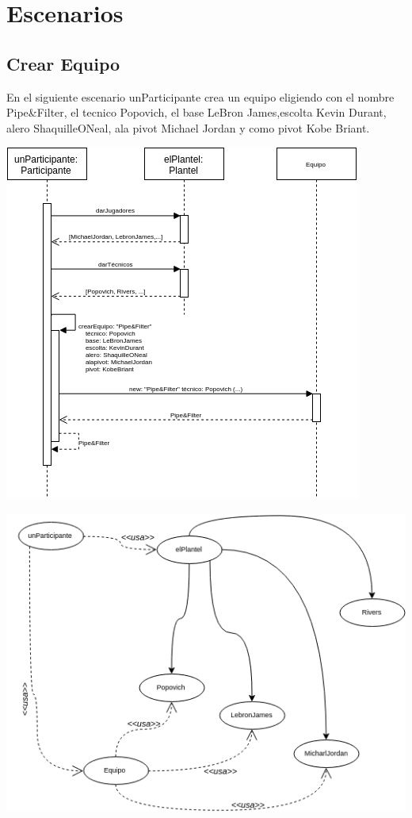 \section{Escenarios}

\subsection{Crear Equipo}

En el siguiente escenario unParticipante crea un equipo eligiendo con el nombre Pipe\&Filter, el tecnico Popovich, el base LeBron James,escolta Kevin Durant, alero ShaquilleONeal, ala pivot Michael Jordan y como pivot Kobe Briant. 

\includegraphics[width=\textwidth]{imgs/crearEquipoSecuencia.png}

\includegraphics[width=\textwidth]{imgs/crearEquipoObjetos.png}



